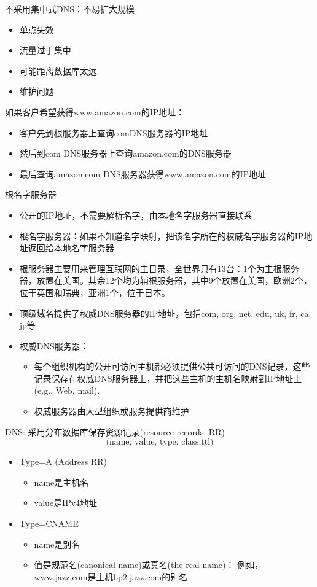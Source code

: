 不采用集中式DNS：不易扩大规模
\begin{itemize}
\item 单点失效
\item 流量过于集中
\item 可能距离数据库太远
\item 维护问题
\end{itemize}

如果客户希望获得www.amazon.com的IP地址：
\begin{itemize}
\item 客户先到根服务器上查询comDNS服务器的IP地址
\item 然后到com DNS服务器上查询amazon.com的DNS服务器
\item 最后查询amazon.com DNS服务器获得www.amazon.com的IP地址
\end{itemize}

根名字服务器
\begin{itemize}
\item 公开的IP地址，不需要解析名字，由本地名字服务器直接联系
\item 根名字服务器：如果不知道名字映射，把该名字所在的权威名字服务器的IP地址返回给本地名字服务器
\item 根服务器主要用来管理互联网的主目录，全世界只有13台：1个为主根服务器，放置在美国。其余12个均为辅根服务器，其中9个放置在美国，欧洲2个，位于英国和瑞典，亚洲1个，位于日本。
\end{itemize}

\begin{itemize}
\item 顶级域名提供了权威DNS服务器的IP地址，包括com, org, net, edu, uk, fr, ca, jp等
\item 权威DNS服务器：
\begin{itemize}
\item 每个组织机构的公开可访问主机都必须提供公共可访问的DNS记录，这些记录保存在权威DNS服务器上，并把这些主机的主机名映射到IP地址上(e.g., Web, mail).
\item 权威服务器由大型组织或服务提供商维护
\end{itemize}
\end{itemize}

DNS: 采用分布数据库保存资源记录(resource records, RR)
\[\text{(name, value, type, class,ttl)}\]
\begin{itemize}
\item Type=A (Address RR)
\begin{itemize}
\item name是主机名
\item value是IPv4地址
\end{itemize}
\item Type=CNAME
\begin{itemize}
\item name是别名
\item 值是规范名(canonical name)或真名(the real name)：
例如， www.jazz.com是主机bp2.jazz.com的别名
\end{itemize}
\end{itemize}


